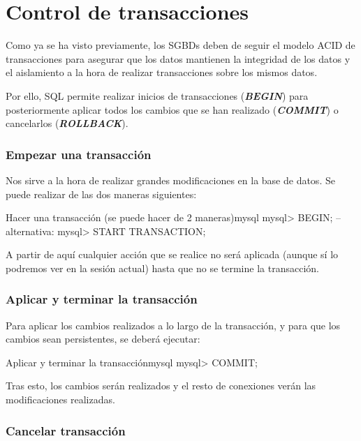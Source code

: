 \section{Control de transacciones}
Como ya se ha visto previamente, los SGBDs deben de seguir el modelo ACID de transacciones para asegurar que los datos mantienen la integridad de los datos y el aislamiento a la hora de realizar transacciones sobre los mismos datos.

Por ello, SQL permite realizar inicios de transacciones (\textit{\textbf{BEGIN}}) para posteriormente aplicar todos los cambios que se han realizado (\textit{\textbf{COMMIT}}) o cancelarlos (\textit{\textbf{ROLLBACK}}).




\subsubsection*{Empezar una transacción}
Nos sirve a la hora de realizar grandes modificaciones en la base de datos. Se puede realizar de las dos maneras siguientes:

\begin{mycode}{Hacer una transacción (se puede hacer de 2 maneras)}{mysql}{}
mysql> BEGIN;
-- alternativa:
mysql> START TRANSACTION;
\end{mycode}

A partir de aquí cualquier acción que se realice no será aplicada (aunque sí lo podremos ver en la sesión actual) hasta que no se termine la transacción.

\subsubsection*{Aplicar y terminar la transacción}
Para aplicar los cambios realizados a lo largo de la transacción, y para que los cambios sean persistentes, se deberá ejecutar:

\begin{mycode}{Aplicar y terminar la transacción}{mysql}{}
mysql> COMMIT;
\end{mycode}


Tras esto, los cambios serán realizados y el resto de conexiones verán las modificaciones realizadas.


\subsubsection*{Cancelar transacción}

